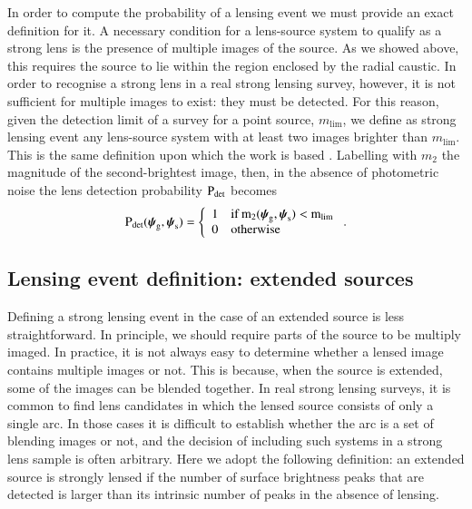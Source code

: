 \documentclass{aa}
\def\psilens{\boldsymbol{\psi}_\mathrm{g}}
\def\psisource{\boldsymbol{\psi}_\mathrm{s}}
\def\pdet{{\rm P}_\mathrm{det}}
\begin{document}
In order to compute the probability of a lensing event we must provide an exact definition for it.
A necessary condition for a lens-source system to qualify as a strong lens is the presence of multiple images of the source.
As we showed above, this requires the source to lie within the region enclosed by the radial caustic.
In order to recognise a strong lens in a real strong lensing survey, however, it is not sufficient for multiple images to exist: they must be detected.
For this reason, given the detection limit of a survey for a point source, $m_{\mathrm{lim}}$, we define as strong lensing event any lens-source system with at least two images brighter than $m_{\mathrm{lim}}$.
This is the same definition upon which the \citet{MVK09} work is based \citep{VMK09}.
Labelling with $m_2$ the magnitude of the second-brightest image, then, in the absence of photometric noise the lens detection probability $\pdet$ becomes
\begin{equation}\label{eq:pointdet}
\pdet(\psilens,\psisource) = \left\{\begin{array}{ll} 1 & \rm{if}\,m_2(\psilens,\psisource) < m_{\mathrm{lim}} \\
0 & \rm{otherwise}\end{array}\right. .
\end{equation}

\subsection{Lensing event definition: extended sources}\label{ssec:lensdefext}

Defining a strong lensing event in the case of an extended source is less straightforward.
In principle, we should require parts of the source to be multiply imaged.
In practice, it is not always easy to determine whether a lensed image contains multiple images or not.
This is because, when the source is extended, some of the images can be blended together.
In real strong lensing surveys, it is common to find lens candidates in which the lensed source consists of only a single arc. In those cases it is difficult to establish whether the arc is a set of blending images or not, and the decision of including such systems in a strong lens sample is often arbitrary.
Here we adopt the following definition: an extended source is strongly lensed if the number of surface brightness peaks that are detected is larger than its intrinsic number of peaks in the absence of lensing.
\end{document}
